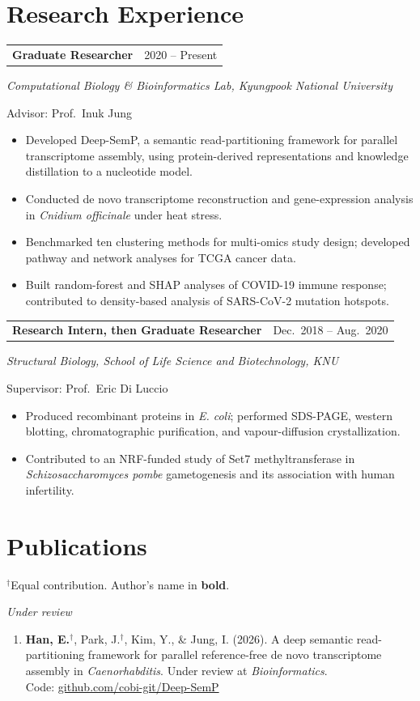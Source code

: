 \documentclass[11pt,a4paper]{article}
\makeatletter
\newcommand{\me}[1]{\textbf{#1}}
\newcommand{\entry}[2]{\begin{tabularx}{\linewidth}{@{}>{\raggedright\arraybackslash}X r@{}}\textbf{#1}&\small\color{accent}#2\end{tabularx}\par}
\newcommand{\subentry}[1]{{\itshape #1}\par}
\makeatother
\begin{document}
\section{Research Experience}
\entry{Graduate Researcher}{2020 -- Present}
\subentry{Computational Biology \& Bioinformatics Lab, Kyungpook National University}
Advisor: Prof.\ Inuk Jung
\begin{itemize}
  \item Developed Deep-SemP, a semantic read-partitioning framework for parallel
    transcriptome assembly, using protein-derived representations and knowledge
    distillation to a nucleotide model.
  \item Conducted de novo transcriptome reconstruction and gene-expression analysis
    in \emph{Cnidium officinale} under heat stress.
  \item Benchmarked ten clustering methods for multi-omics study design; developed
    pathway and network analyses for TCGA cancer data.
  \item Built random-forest and SHAP analyses of COVID-19 immune response; contributed
    to density-based analysis of SARS-CoV-2 mutation hotspots.
\end{itemize}
\vspace{3pt}
\entry{Research Intern, then Graduate Researcher}{Dec.\ 2018 -- Aug.\ 2020}
\subentry{Structural Biology, School of Life Science and Biotechnology, KNU}
Supervisor: Prof.\ Eric Di Luccio
\begin{itemize}
  \item Produced recombinant proteins in \emph{E. coli}; performed SDS-PAGE, western
    blotting, chromatographic purification, and vapour-diffusion crystallization.
  \item Contributed to an NRF-funded study of Set7 methyltransferase in
    \emph{Schizosaccharomyces pombe} gametogenesis and its association with human infertility.
\end{itemize}

\newpage
\section{Publications}
{\small $^{\dagger}$Equal contribution. Author's name in \textbf{bold}.}

\subentry{Under review}
\begin{enumerate}
  \item \me{Han, E.}$^{\dagger}$, Park, J.$^{\dagger}$, Kim, Y., \& Jung, I. (2026).
    A deep semantic read-partitioning framework for parallel reference-free de novo
    transcriptome assembly in \emph{Caenorhabditis}.
    Under review at \emph{Bioinformatics}.\\
    Code: \href{https://github.com/cobi-git/Deep-SemP}{github.com/cobi-git/Deep-SemP}
\end{enumerate}
\end{document}
